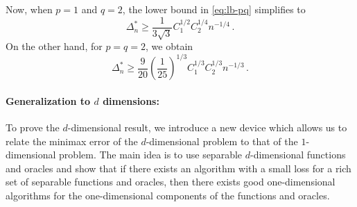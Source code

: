 Now, when $p=1$ and $q=2$, the lower bound in \eqref{eq:lb-pq} simplifies to 
\[
\Delta_n^{*} \ge \dfrac{ 1}{3\sqrt{3}} C_1^{1/2}C_2^{1/4} n^{-1/4} \,.
\]
On the other hand, for $p=q=2$, we obtain 
\[
\Delta_n^{*} \ge  \frac{9}{20}\left(\frac{1}{25}\right)^{1/3}C_1^{1/3}C_2^{1/3} n^{-1/3}\,.
\]

\paragraph{Generalization to $d$ dimensions:}
To prove the $d$-dimensional result, we introduce a new device which allows us to relate the minimax error of the $d$-dimensional problem to that of the $1$-dimensional problem.
The main idea is to use separable $d$-dimensional functions and oracles and show that if there exists an algorithm with a small loss for a rich set of separable functions and oracles, then there exists good one-dimensional algorithms for the one-dimensional components of the functions and oracles.

